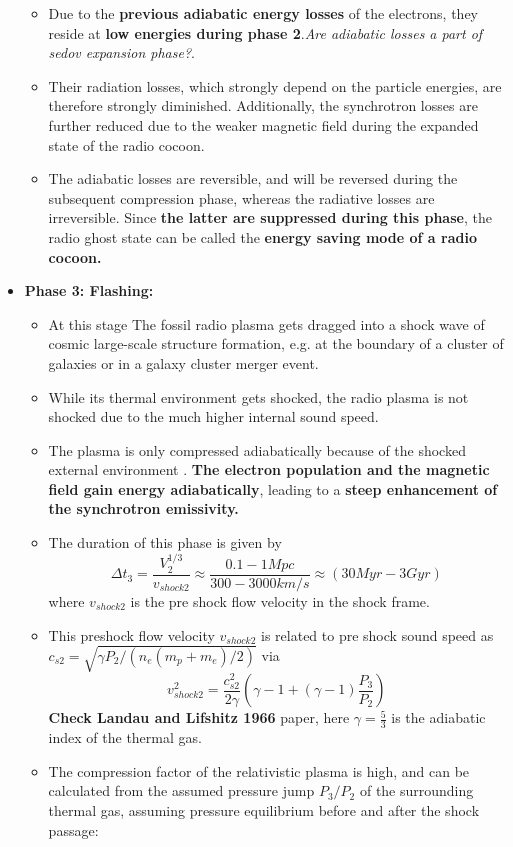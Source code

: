 \documentclass[12pt]{report}
\newcommand{\tbf}[1]{\textbf{#1}}
\newcommand{\tit}[1]{\textit{#1}}
\newcommand{\cc}[1]{\left({#1}\right)}
\begin{document}
\begin{itemize}
\begin{itemize}
\item Due to the \tbf{previous adiabatic energy losses} of the electrons, they reside at \tbf{low energies during phase 2}.\tit{Are adiabatic losses a part of sedov expansion phase?}.
\item Their radiation losses, which strongly depend on the particle energies, are therefore strongly diminished.  Additionally, the synchrotron losses are further reduced due to the weaker magnetic field during the expanded state of the radio cocoon.
\item The adiabatic losses are reversible, and will be reversed during the subsequent compression phase, whereas the radiative losses are irreversible. Since \tbf{the latter are suppressed during this phase}, the radio ghost state can be called the \tbf{energy saving mode of a radio cocoon.}
\end{itemize}
\item \textbf{Phase 3: Flashing:} 
\begin{itemize}
\item At this stage The fossil radio plasma gets dragged into a shock wave of cosmic large-scale structure formation, e.g. at the boundary of a cluster of galaxies or in a galaxy cluster merger event.
\item  While its thermal environment gets shocked, the radio plasma is not shocked due to the much higher internal sound speed.
\item The plasma is only compressed adiabatically because of the shocked external environment . \tbf{The electron population and the magnetic field gain energy adiabatically}, leading to a \tbf{steep enhancement of the synchrotron emissivity.}
\item The duration of this phase is given by
\begin{equation}
\Delta t_3= \frac{V^{1/3}_2}{v_{shock2}}\approx \frac{0.1-1Mpc}{300-3000km/s}\approx \cc{30Myr-3Gyr}
\end{equation} 
where $v_{shock2}$ is the pre shock flow velocity in the shock frame.
\item This preshock flow velocity $v_{shock2}$ is related to pre shock sound speed as $c_{s2}=\sqrt{\gamma P_2/\cc{n_e(m_p+m_e)/2}}$ via
\begin{equation}
v^2 _{shock2}=\frac{c^2_{s2}}{2 \gamma}\cc{\gamma-1+(\gamma-1)\frac{P_3}{P_2}}
\end{equation}
\textbf{Check Landau and Lifshitz 1966} paper, here $\gamma=\frac{5}{3}$ is the adiabatic index of the thermal gas.
\item  The compression factor of the relativistic plasma is high, and can be calculated from the assumed pressure jump $P_3/P_2$ of the surrounding thermal gas, assuming pressure equilibrium before and after the shock passage:

\end{itemize}
\end{itemize}
\end{document}
